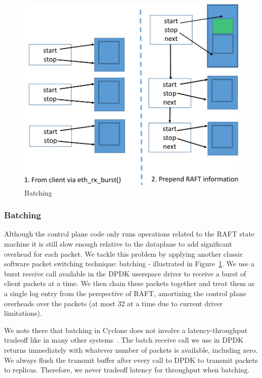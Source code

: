\documentclass[10pt, preprint, nonatbib]{sigplanconf}
\begin{document}
\begin{figure}
  \centering
  \includegraphics[scale=0.3]{figures2/batching.pdf}
  \caption{Batching}
  \label{fig:batching}
\end{figure}

\subsubsection{Batching}
Although the control plane code only runs operations related to the RAFT state
machine it is still slow enough relative to the dataplane to add significant
overhead for each packet. We tackle this problem by applying another classic
software packet switching technique: batching - illustrated in
Figure~\ref{fig:batching}. We use a burst receive call available in the DPDK
userspace driver to receive a burst of client packets at a time. We then chain
these packets together and treat them as a single log entry from the perspective
of RAFT, amortizing the control plane overheads over the packets (at most 32 at
a time due to current driver limitations).

We note there that batching in Cyclone does not involve a latency-throughput
tradeoff like in many other systems~\cite{ix-dataplane}. The batch receive call
we use in DPDK returns immediately with whatever number of packets is available,
including zero. We always flush the transmit buffer after every call to DPDK to
transmit packets to replicas. Therefore, we never tradeoff latency for
throughput when batching. 
\end{document}
